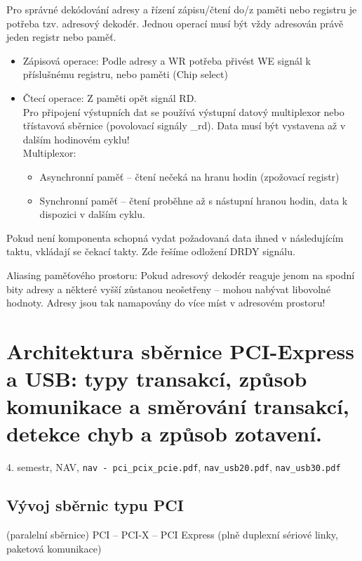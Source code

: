\documentclass[a4paper, 11pt]{report}
\begin{document}
Pro správné dekódování adresy a řízení zápisu/čtení do/z paměti nebo registru je potřeba tzv. adresový dekodér. Jednou operací musí být vždy adresován právě jeden registr nebo paměť.
\begin{itemize}
	\item Zápisová operace: Podle adresy a WR potřeba přivést WE signál k příslušnému registru, nebo paměti (Chip select)
	\item Čtecí operace: Z paměti opět signál RD.\\
	Pro připojení výstupních dat se používá výstupní datový multiplexor nebo třístavová sběrnice (povolovací signály \_rd). Data musí být vystavena až v dalším hodinovém cyklu!\\
	Multiplexor: 
	\begin{itemize}
		\item Asynchronní paměť -- čtení nečeká na hranu hodin (zpožovací registr)
		\item Synchronní paměť -- čtení proběhne až s nástupní hranou hodin, data k dispozici v dalším cyklu.
	\end{itemize}
\end{itemize}

Pokud není komponenta schopná vydat požadovaná data ihned v následujícím taktu, vkládají se čekací takty. Zde řešíme odložení DRDY signálu.

Aliasing paměťového prostoru: Pokud adresový dekodér reaguje jenom na spodní bity adresy a některé vyšší zůstanou neošetřeny -- mohou nabývat libovolné hodnoty. Adresy jsou tak namapovány do více míst v adresovém prostoru!



\chapter{Architektura sběrnice PCI-Express a USB: typy transakcí, způsob komunikace a směrování transakcí, detekce chyb a způsob zotavení.} \label{cha:63}
4. semestr, NAV, \texttt{nav - pci\_pcix\_pcie.pdf}, \texttt{nav\_usb20.pdf}, \texttt{nav\_usb30.pdf}

\section{Vývoj sběrnic typu PCI}

(paralelní sběrnice) PCI -- PCI-X -- PCI Express (plně duplexní sériové linky, paketová komunikace)
\end{document}
